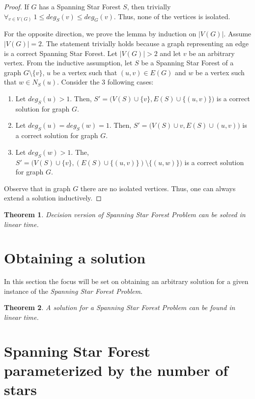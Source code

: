 \documentclass[en]{pracamgr}
\newtheorem{theorem}{Theorem}
\begin{document}
\begin{proof}
	If $G$ has a Spanning Star Forest $S$, then trivially 
	$\forall_{v \in V(G)}\ 1 \leq deg_S(v) \leq deg_G(v)$. Thus, none of the
	vertices is isolated.
	
	For the opposite direction, we prove the lemma by induction on $|V(G)|$.
	Assume ${|V(G)|=2}$. The statement trivially holds because a graph representing
	an edge is a correct Spanning Star Forest. Let $|V(G)| >2$ and let $v$ be an
	arbitrary vertex. From the inductive assumption, let $S$ be a Spanning Star
	Forest of a graph $G \setminus \{v\}$, $u$ be a vertex such that $(u,v)
	\in E(G)$ and $w$ be a vertex such that $w \in N_S(u)$. Consider the 3
	following cases:
	\begin{enumerate}
		\item Let $deg_S(u) > 1$. Then, $S'=\big(V(S) \cup \{v\}, E(S) \cup \{(u,v)\}\big)$ is a correct solution for graph $G$.
		\item Let $deg_S(u) = deg_S(w) = 1$. Then, $S'=\big(V(S) \cup {v}, E(S) \cup
		(u,v)\big)$ is a correct solution for graph $G$.
		\item Let $deg_S(w) > 1$. The, $S'=\big(V(S) \cup \{v\}, 
		(E(S) \cup \{(u,v)\}) \setminus \{(u,w)\}\big)$ is a correct solution for graph $G$.
	\end{enumerate}
		Observe that in graph $G$ there are no isolated vertices. Thus, one can
		always extend a solution inductively.
		
	
	
\end{proof}

\begin{theorem}
	Decision version of Spanning Star Forest Problem can be solved in linear
	time.
\end{theorem}

\section{Obtaining a solution}

In this section the focus will be set on obtaining an arbitrary solution for
a given instance of the \emph{Spanning Star Forest Problem}.

\begin{theorem}
	A solution for a Spanning Star Forest Problem can be found in linear time.
\end{theorem}

\section{Spanning Star Forest parameterized by the number of stars}
\end{document}
